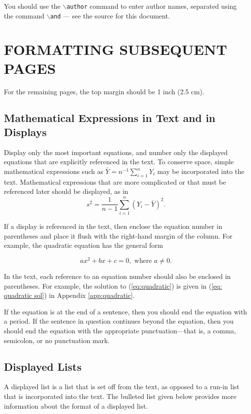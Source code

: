 \documentclass{wscpaperproc}
\theoremstyle{wsc}
\begin{document}
You should use the {\tt $\backslash$author} command to enter author names, separated using the command {\tt $\backslash$and} --- see the source for this document.

\section{FORMATTING SUBSEQUENT PAGES}
For the remaining pages, the top margin should be 1 inch (2.5 cm).

\subsection{Mathematical Expressions in Text and in Displays}
Display only the most important equations, and number only the displayed equations that are explicitly referenced in the text.
To conserve space, simple mathematical expressions such as $\bar Y = n^{-1} \sum_{i=1}^n Y_i$ may be incorporated into the text.
Mathematical expressions that are more complicated or that must be referenced later should be displayed, as in
$$s^2 = \frac 1 {n-1} \sum_{i=1}^n (Y_i - \bar Y)^2.$$

If a display is referenced in the text, then enclose the equation number in parentheses and place it flush with the right-hand margin of the
column. For example, the quadratic equation has the general form

\begin{equation} \label{eq:quadratic}
ax^2 + bx + c = 0, \mbox{ where } a \ne 0.
\end{equation}

In the text, each reference to an equation number should also be enclosed in parentheses. For example, the solution to (\ref{eq:quadratic}) is given in (\ref{eq: quadratic sol}) in Appendix \ref{app:quadratic}.

If the equation is at the end of a sentence, then you should end the equation with a period. If the sentence in question continues beyond the equation, then you should end the equation with the appropriate punctuation---that is, a comma, semicolon, or no punctuation mark.

\subsection{Displayed Lists}
A displayed list is a list that is set off from the text, as opposed to a run-in list that is incorporated into the text. The bulleted list given below provides more information about the format of a displayed list.
\end{document}

